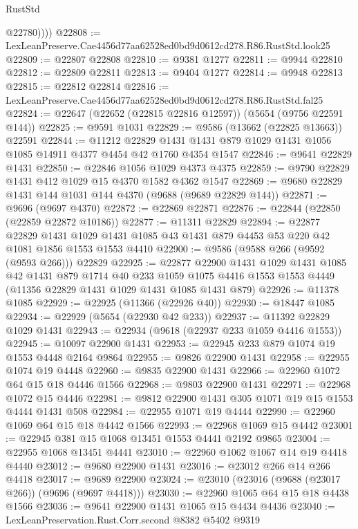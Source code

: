 \begin{lexlean}{RustStd}
\begin{coremodule}
            @22780))))
@22808 := LexLeanPreserve.Cae4456d77aa62528ed0bd9d0612cd278.R86.RustStd.look25
@22809 := @22807 @22808
@22810 := @9381 @1277
@22811 := @9944 @22810
@22812 := @22809 @22811
@22813 := @9404 @1277
@22814 := @9948 @22813
@22815 := @22812 @22814
@22816 := LexLeanPreserve.Cae4456d77aa62528ed0bd9d0612cd278.R86.RustStd.fal25
@22824 := @22647 (@22652 (@22815 @22816 @12597)) (@5654 (@9756 @22591 @144))
@22825 := @9591 @1031
@22829 := @9586 (@13662 (@22825 @13663)) @22591
@22844 := @11212
    @22829
    @1431
    @1431
    @879
    @1029
    @1431
    @1056
    @1085
    @14911
    @4377
    @4454
    @42
    @1760
    @4354
    @1547
@22846 := @9641 @22829 @1431
@22850 := @22846 @1056 @1029 @4373 @4375
@22859 := @9790 @22829 @1431 @412 @1029 @15 @4370 @1582 @4362 @1547
@22869 := @9680 @22829 @1431 @144 @1031 @144 @4370 (@9688 (@9689 @22829 @144))
@22871 := @9696 (@9697 @4370)
@22872 := @22869 @22871
@22876 := @22844 (@22850 (@22859 @22872 @10186))
@22877 := @11311 @22829
@22894 := @22877
    @22829
    @1431
    @1029
    @1431
    @1085
    @43
    @1431
    @879
    @4453
    @53
    @220
    @42
    @1081
    @1856
    @1553
    @1553
    @4410
@22900 := @9586 (@9588 @266 (@9592 (@9593 @266))) @22829
@22925 := @22877
    @22900
    @1431
    @1029
    @1431
    @1085
    @42
    @1431
    @879
    @1714
    @40
    @233
    @1059
    @1075
    @4416
    @1553
    @1553
    @4449
    (@11356 @22829 @1431 @1029 @1431 @1085 @1431 @879)
@22926 := @11378 @1085
@22929 := @22925 (@11366 (@22926 @40))
@22930 := @18447 @1085
@22934 := @22929 (@5654 (@22930 @42 @233))
@22937 := @11392 @22829 @1029 @1431
@22943 := @22934 (@9618 (@22937 @233 @1059 @4416 @1553))
@22945 := @10097 @22900 @1431
@22953 := @22945 @233 @879 @1074 @19 @1553 @4448 @2164 @9864
@22955 := @9826 @22900 @1431
@22958 := @22955 @1074 @19 @4448
@22960 := @9835 @22900 @1431
@22966 := @22960 @1072 @64 @15 @18 @4446 @1566
@22968 := @9803 @22900 @1431
@22971 := @22968 @1072 @15 @4446
@22981 := @9812 @22900 @1431 @305 @1071 @19 @15 @1553 @4444 @1431 @508
@22984 := @22955 @1071 @19 @4444
@22990 := @22960 @1069 @64 @15 @18 @4442 @1566
@22993 := @22968 @1069 @15 @4442
@23001 := @22945 @381 @15 @1068 @13451 @1553 @4441 @2192 @9865
@23004 := @22955 @1068 @13451 @4441
@23010 := @22960 @1062 @1067 @14 @19 @4418 @4440
@23012 := @9680 @22900 @1431
@23016 := @23012 @266 @14 @266 @4418
@23017 := @9689 @22900
@23024 := @23010 (@23016 (@9688 (@23017 @266)) (@9696 (@9697 @4418)))
@23030 := @22960 @1065 @64 @15 @18 @4438 @1566
@23036 := @9641 @22900 @1431 @1065 @15 @4434 @4436
@23040 := LexLeanPreservation.Rust.Corr.second @8382 @5402 @9319

\end{coremodule}
\end{lexlean}
